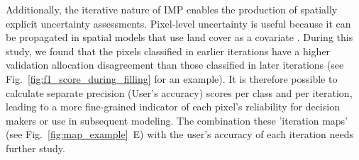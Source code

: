         Additionally, the iterative nature of IMP enables the production of spatially explicit uncertainty assessments. Pixel-level uncertainty is useful because it can be propagated in spatial models that use land cover as a covariate \citep{herold2016toward}. During this study, we found that the pixels classified in earlier iterations have a higher validation allocation disagreement than those classified in later iterations (see Fig.~\ref{fig:f1_score_during_filling} for an example). It is therefore possible to calculate separate precision (User's accuracy) scores per class and per iteration, leading to a more fine-grained indicator of each pixel's reliability for decision makers or use in subsequent modeling. The combination these 'iteration maps' (see Fig.~\ref{fig:map_example}~E)  with the user's accuracy of each iteration needs further study. 

